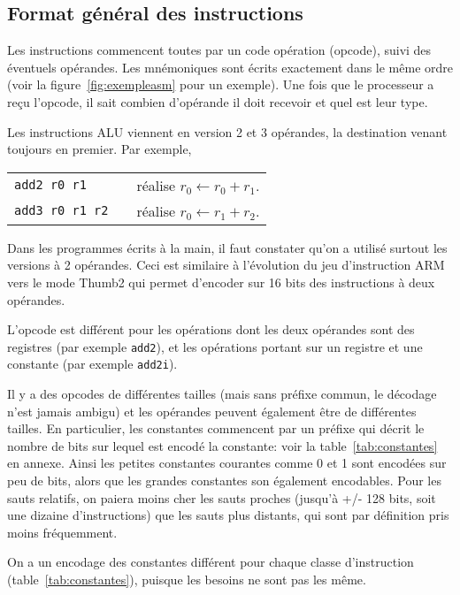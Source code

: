 \documentclass[architecture]{compas2018}
\begin{document}
\subsection{Format général des instructions}
Les instructions commencent toutes par un code opération (opcode), suivi des éventuels opérandes.
Les mnémoniques sont écrits exactement dans le même ordre (voir la figure~\ref{fig:exempleasm} pour un exemple).  
Une fois que le processeur a reçu l'opcode, il sait combien d'opérande il doit recevoir et quel est leur type.


Les instructions ALU viennent en version 2 et 3 opérandes, la destination venant toujours en premier.
Par exemple, \\
  \begin{tabular}{lcl}
 \texttt{add2 r0 r1}&& réalise $r_0 \leftarrow r_0+r_1$. \\
 \texttt{add3 r0 r1 r2}&& réalise $r_0 \leftarrow r_1+r_2$.
  \end{tabular}
  
  Dans les programmes écrits à la main, il faut constater qu'on a utilisé surtout les versions à 2 opérandes.
  Ceci est similaire à l'évolution du jeu d'instruction ARM vers le mode Thumb2 qui permet d'encoder sur 16 bits des instructions à deux opérandes. 
  
 L'opcode est différent pour les opérations dont les deux opérandes  sont des registres (par exemple \texttt{add2}), et les opérations portant sur un registre et une constante (par exemple \texttt{add2i}).

Il y a des opcodes de différentes tailles (mais sans préfixe commun, le décodage n'est jamais ambigu)  et les opérandes peuvent également être de différentes tailles.
En particulier, les constantes commencent par un préfixe qui décrit le nombre de bits sur lequel est encodé la constante: voir la table~\ref{tab:constantes} en annexe.
Ainsi les petites constantes courantes comme 0 et 1 sont encodées sur peu de bits, alors que les grandes constantes son également encodables.
Pour les sauts relatifs, on paiera moins cher les sauts proches (jusqu'à +/- 128 bits, soit une dizaine d'instructions) que les sauts plus distants, qui sont par définition pris moins fréquemment.

On a un encodage des constantes différent pour chaque classe d'instruction (table~\ref{tab:constantes}), puisque les besoins ne sont pas les même.
\end{document}
